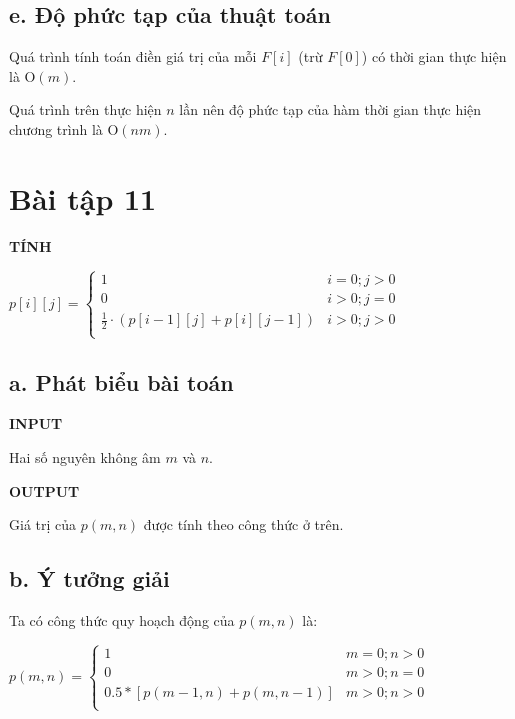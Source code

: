 \documentclass[12pt, a4paper, fleqn]{article}
\begin{document}
	\subsection*{e. Độ phức tạp của thuật toán}
		
		Quá trình tính toán điền giá trị của mỗi $F[i]$ (trừ $F[0]$) có thời gian thực hiện là O$(m)$.
		
		Quá trình trên thực hiện $n$ lần nên độ phức tạp của hàm thời gian thực hiện chương trình là O$(nm)$.
	
	\clearpage
	
	\section*{Bài tập 11}
	
	
	\textbf{TÍNH}
	
	$p[i][j] = {
		\begin{cases}
			1 & {i = 0; j > 0} \\
			0 & {i > 0; j = 0} \\
			\displaystyle \frac{1}{2} \cdot (p[i - 1][j] + p[i][j - 1]) & {i > 0; j > 0} \\
		\end{cases}
	}$
	
	\subsection*{a. Phát biểu bài toán}
	
	\textbf{INPUT}
	
	Hai số nguyên không âm $m$ và $n$.
	
	\textbf{OUTPUT}
	
	Giá trị của $p(m, n)$ được tính theo công thức ở trên.
	
	\subsection*{b. Ý tưởng giải}
	
	Ta có công thức quy hoạch động của $p(m, n)$ là:
	
	$p(m, n) = {
		\begin{cases}
		1 & {m = 0; n > 0} \\
		0 & {m > 0; n = 0} \\
		0.5 * [p(m - 1, n) + p(m, n - 1)] & {m > 0; n > 0} \\
		\end{cases}
	}$
\end{document}
